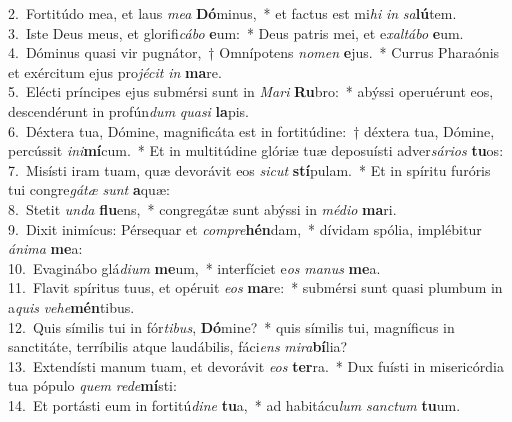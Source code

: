 {2.~}Fortitúdo mea, et laus \textit{me}\textit{a} \textbf{Dó}minus,~* et factus est mi\textit{hi} \textit{in} \textit{sa}\textbf{lú}tem.\\
{3.~}Iste Deus meus, et glorifi\textit{cá}\textit{bo} \textbf{e}um:~* Deus patris mei, et e\textit{xal}\textit{tá}\textit{bo} \textbf{e}um.\\
{4.~}Dóminus quasi vir pugnátor,~† Omnípotens \textit{no}\textit{men} \textbf{e}jus.~* Currus Pharaónis et exércitum ejus pro\textit{jé}\textit{cit} \textit{in} \textbf{ma}re.\\
{5.~}Elécti príncipes ejus submérsi sunt in \textit{Ma}\textit{ri} \textbf{Ru}bro:~* abýssi operuérunt eos, descendérunt in profún\textit{dum} \textit{qua}\textit{si} \textbf{la}pis.\\
{6.~}Déxtera tua, Dómine, magnificáta est in fortitúdine:~† déxtera tua, Dómine, percússit \textit{i}\textit{ni}\textbf{mí}cum.~* Et in multitúdine glóriæ tuæ deposuísti adver\textit{sá}\textit{ri}\textit{os} \textbf{tu}os:\\
{7.~}Misísti iram tuam, quæ devorávit eos \textit{si}\textit{cut} \textbf{stí}pulam.~* Et in spíritu furóris tui congre\textit{gá}\textit{tæ} \textit{sunt} \textbf{a}quæ:\\
{8.~}Stetit \textit{un}\textit{da} \textbf{flu}ens,~* congregátæ sunt abýssi in \textit{mé}\textit{di}\textit{o} \textbf{ma}ri.\\
{9.~}Dixit inimícus: Pérsequar et \textit{com}\textit{pre}\textbf{hén}dam,~* dívidam spólia, implébitur \textit{á}\textit{ni}\textit{ma} \textbf{me}a:\\
{10.~}Evaginábo glá\textit{di}\textit{um} \textbf{me}um,~* interfíciet e\textit{os} \textit{ma}\textit{nus} \textbf{me}a.\\
{11.~}Flavit spíritus tuus, et opéruit \textit{e}\textit{os} \textbf{ma}re:~* submérsi sunt quasi plumbum in a\textit{quis} \textit{ve}\textit{he}\textbf{mén}tibus.\\
{12.~}Quis símilis tui in fór\textit{ti}\textit{bus}, \textbf{Dó}mine?~* quis símilis tui, magníficus in sanctitáte, terríbilis atque laudábilis, fáci\textit{ens} \textit{mi}\textit{ra}\textbf{bí}lia?\\
{13.~}Extendísti manum tuam, et devorávit \textit{e}\textit{os} \textbf{ter}ra.~* Dux fuísti in misericórdia tua pópulo \textit{quem} \textit{re}\textit{de}\textbf{mí}sti:\\
{14.~}Et portásti eum in fortitú\textit{di}\textit{ne} \textbf{tu}a,~* ad habitácu\textit{lum} \textit{san}\textit{ctum} \textbf{tu}um.\\
